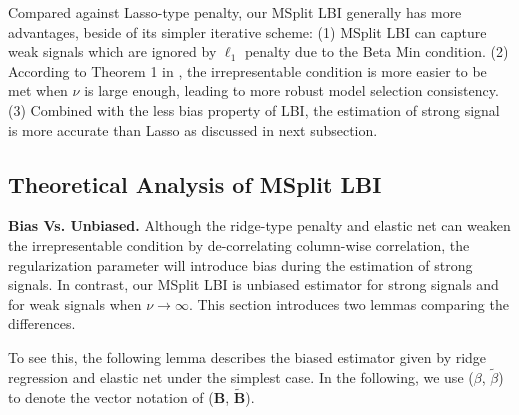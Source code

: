 \documentclass{article}
\begin{document}
Compared against Lasso-type penalty, our MSplit LBI generally
has more advantages, beside of its simpler iterative scheme: (1) MSplit
LBI can capture weak signals which are ignored by $\ell_{1}$ penalty
due to the Beta Min condition. (2) According to Theorem 1 in \citet{Splitlbi},
the irrepresentable condition is more easier to be met when $\nu$
is large enough, leading to more robust model selection consistency.
(3) Combined with the less bias property of LBI, the estimation of
strong signal is more accurate than Lasso as discussed in next subsection.


\subsection{Theoretical Analysis of MSplit LBI \label{subsec:Theoretical-Analysis-of}}


\noindent \textbf{Bias Vs. Unbiased.} Although the ridge-type penalty
and elastic net can weaken the irrepresentable condition by de-correlating
column-wise correlation, the regularization parameter will introduce
bias during the estimation of strong signals. In contrast, our MSplit
LBI is unbiased estimator for strong signals and for weak signals
when $\nu\to\infty$. This section introduces two lemmas comparing
the differences.


To see this, the following lemma describes the biased estimator given
by ridge regression and elastic net under the simplest case. {In the following, we use
($\beta$, $\tilde{\beta}$) to denote the vector notation of ($\mathbf{B}$, $\mathbf{\widetilde{B}}$).}
\end{document}
